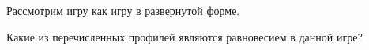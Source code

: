 Рассмотрим игру как игру в развернутой форме.

Какие из перечисленных профилей являются равновесием в данной игре?

\begin{enumerate}[label=$\square$]
	
	
	
	

\end{enumerate}
